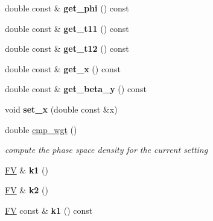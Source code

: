 \begin{DoxyCompactItemize}
\item 
\hypertarget{classPS__2__2_a28bf4d69f8fcb2b359f521289a6a70d1}{}double const \& {\bfseries get\+\_\+phi} () const \label{classPS__2__2_a28bf4d69f8fcb2b359f521289a6a70d1}

\item 
\hypertarget{classPS__2__2_ae717002f8f6d84446f4353aa3cc97757}{}double const \& {\bfseries get\+\_\+t11} () const \label{classPS__2__2_ae717002f8f6d84446f4353aa3cc97757}

\item 
\hypertarget{classPS__2__2_a9e2bc01c150ce569013cebf16ca34528}{}double const \& {\bfseries get\+\_\+t12} () const \label{classPS__2__2_a9e2bc01c150ce569013cebf16ca34528}

\item 
\hypertarget{classPS__2__2_a3b1392c5e6a6e894b87926611333e782}{}double const \& {\bfseries get\+\_\+x} () const \label{classPS__2__2_a3b1392c5e6a6e894b87926611333e782}

\item 
\hypertarget{classPS__2__2_a7c253fa9526fb882c0fb386700f0a084}{}double const \& {\bfseries get\+\_\+beta\+\_\+y} () const \label{classPS__2__2_a7c253fa9526fb882c0fb386700f0a084}

\item 
\hypertarget{classPS__2__2_ab38bb5b8ac36bea7b044a72d0c9cfdbb}{}void {\bfseries set\+\_\+x} (double const \&x)\label{classPS__2__2_ab38bb5b8ac36bea7b044a72d0c9cfdbb}

\item 
\hypertarget{classPS__2__2_ad816da6fba743fbe6d7e67e119ad1cca}{}double \hyperlink{classPS__2__2_ad816da6fba743fbe6d7e67e119ad1cca}{cmp\+\_\+wgt} ()\label{classPS__2__2_ad816da6fba743fbe6d7e67e119ad1cca}

\begin{DoxyCompactList}\small\item\em compute the phase space density for the current setting \end{DoxyCompactList}\item 
\hypertarget{classPS__2__2_a11a23bbf3ce1288121b6f798012039ea}{}\hyperlink{classFV}{F\+V} \& {\bfseries k1} ()\label{classPS__2__2_a11a23bbf3ce1288121b6f798012039ea}

\item 
\hypertarget{classPS__2__2_ae80de8ff0390f3a92cf8cb55bafcfa39}{}\hyperlink{classFV}{F\+V} \& {\bfseries k2} ()\label{classPS__2__2_ae80de8ff0390f3a92cf8cb55bafcfa39}

\item 
\hypertarget{classPS__2__2_a50a2e1f1876ab83fbee307434053f9f5}{}\hyperlink{classFV}{F\+V} const \& {\bfseries k1} () const \label{classPS__2__2_a50a2e1f1876ab83fbee307434053f9f5}


\end{DoxyCompactItemize}
